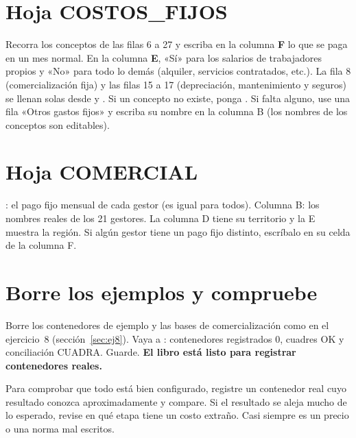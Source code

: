 \section{Hoja COSTOS\_FIJOS}


\begin{pasos}
\paso Recorra los conceptos de las filas 6 a 27 y escriba en la columna \textbf{F} lo que se paga en un mes normal.
\paso En la columna \textbf{E}, «Sí» para los salarios de trabajadores propios y «No» para todo lo demás (alquiler, servicios contratados, etc.).
\paso La fila 8 (comercialización fija) y las filas 15 a 17 (depreciación, mantenimiento y seguros) se llenan solas desde  y .
\paso Si un concepto no existe, ponga . Si falta alguno, use una fila «Otros gastos fijos» y escriba su nombre en la columna B
      (los nombres de los conceptos son editables).
\end{pasos}

\section{Hoja COMERCIAL}

\begin{pasos}
\paso {}: el pago fijo mensual de cada gestor (es igual para todos).
\paso Columna B: los nombres reales de los 21 gestores. La columna D tiene su territorio y la E muestra la región.
\paso Si algún gestor tiene un pago fijo distinto, escríbalo en su celda de la columna F.
\end{pasos}

\section{Borre los ejemplos y compruebe}

\begin{pasos}
\paso Borre los contenedores de ejemplo y las bases de comercialización como en el ejercicio~8 (sección~\ref{sec:ej8}).
\paso Vaya a : contenedores registrados 0, cuadres OK y conciliación CUADRA.
\paso Guarde. \textbf{El libro está listo para registrar contenedores reales.}
\end{pasos}

\begin{nota}
Para comprobar que todo está bien configurado, registre un contenedor real cuyo resultado conozca aproximadamente y compare. Si el resultado se
aleja mucho de lo esperado, revise en  qué etapa tiene un costo extraño. Casi siempre es un precio o una norma mal escritos.
\end{nota}
